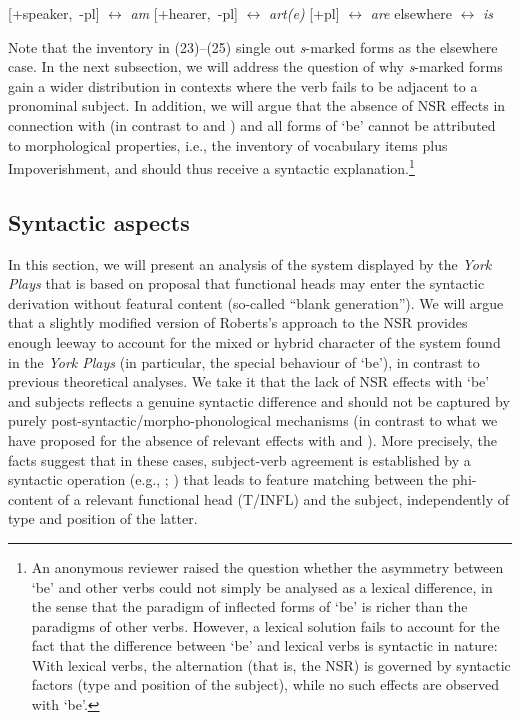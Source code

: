 \documentclass[output=paper]{langsci/langscibook}
\begin{document}
\ea
\ea \mbox{[+speaker, -pl]} $\leftrightarrow$ \emph{am}
\ex \mbox{[+hearer, -pl]} $\leftrightarrow$ \emph{art(e)}
\ex \mbox{[+pl]} $\leftrightarrow$ \emph{are}
\ex elsewhere $\leftrightarrow$ \emph{is}
\z
\z

Note that the inventory in (23)--(25) single out \emph{s}-marked forms as the
elsewhere case. In the next subsection, we will address the question of why
\emph{s}-marked forms gain a wider distribution in contexts where the verb
fails to be adjacent to a pronominal subject. In addition, we will argue that
the absence of \gls{NSR} effects in connection with \Fsg{} (in contrast to
\Ssg{} and \Tsg{}) and all forms of `be' cannot be attributed to morphological
properties, i.e., the inventory of vocabulary items plus Impoverishment, and
should thus receive a syntactic explanation.\footnote{An anonymous reviewer
    raised the question whether the asymmetry between `be' and other verbs
    could not simply be analysed as a lexical difference, in the sense that the
    paradigm of inflected forms of `be' is richer than the paradigms of other
    verbs.  However, a lexical solution fails to account for the fact that the
    difference between `be' and lexical verbs is syntactic in nature: With
    lexical verbs, the  alternation (that is, the
\gls{NSR}) is governed by syntactic factors (type and
position of the subject), while no such effects are observed with `be'.}

\subsection{Syntactic aspects}\label{sub:10.4.2}

In this section, we will present an analysis of the  system
displayed by the \emph{York Plays} that is based on 
proposal that functional heads may enter the syntactic derivation without
featural content (so-called ``blank generation''). We will argue that a
slightly modified version of Roberts's approach to the \gls{NSR} provides enough leeway to account for the mixed or hybrid
    character of the  system found in the \emph{York Plays} (in
    particular, the special behaviour of `be'), in contrast to previous
    theoretical analyses. We take it that the lack of \gls{NSR} effects with `be' and \Fsg{} subjects reflects a genuine
    syntactic difference and should not be captured by purely
    post-syntactic/morpho-phonological mechanisms (in contrast to what we have
    proposed for the absence of relevant effects with \Ssg{} and \Tsg{}). More
    precisely, the facts suggest that in these cases, subject-verb agreement is
    established by a syntactic operation (e.g., ;
    \citealt{Chomsky2000}) that leads to feature matching between the
    phi-content of a relevant functional head (T/INFL) and
    the subject, independently of type and position of the latter.
\end{document}
